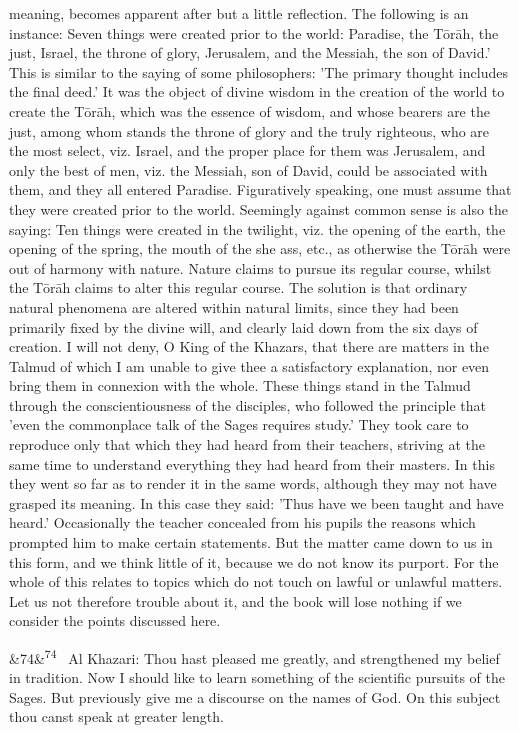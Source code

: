 \documentclass[12pt]{article}
\newcommand{\para}[1][]{\par\noindent\ifx&#1&\else\textsuperscript{\footnotesize #1}~\fi}
\begin{document}
meaning, becomes apparent after but a little reflection. The following is an instance: Seven things were created prior to the world: Paradise, the Tōrāh, the just, Israel, the throne of glory, Jerusalem, and the Messiah, the son of David.' This is similar to the saying of some philosophers: 'The primary thought includes the final deed.' It was the object of divine wisdom in the creation of the world to create the Tōrāh, which was the essence of wisdom, and whose bearers are the just, among whom stands the throne of glory and the truly righteous, who are the most select, viz. Israel, and the proper place for them was Jerusalem, and only the best of men, viz. the Messiah, son of David, could be associated with them, and they all entered Paradise. Figuratively speaking, one must assume that they were created prior to the world. Seemingly against common sense is also the saying: Ten things were created in the twilight, viz. the opening of the earth, the opening of the spring, the mouth of the she ass, etc., as otherwise the Tōrāh were out of harmony with nature. Nature claims to pursue its regular course, whilst the Tōrāh claims to alter this regular course. The solution is that ordinary natural phenomena are altered within natural limits, since they had been primarily fixed by the divine will, and clearly laid down from the six days of creation. I will not deny, O King of the Khazars, that there are matters in the Talmud of which I am unable to give thee a satisfactory explanation, nor even bring them in connexion with the whole. These things stand in the Talmud through the conscientiousness of the disciples, who followed the principle that 'even the commonplace talk of the Sages requires study.' They took care to reproduce only that which they had heard from their teachers, striving at the same time to understand everything they had heard from their masters. In this they went so far as to render it in the same words, although they may not have grasped its meaning. In this case they said: 'Thus have we been taught and have heard.' Occasionally the teacher concealed from his pupils the reasons which prompted him to make certain statements. But the matter came down to us in this form, and we think little of it, because we do not know its purport. For the whole of this relates to topics which do not touch on lawful or unlawful matters. Let us not therefore trouble about it, and the book will lose nothing if we consider the points discussed here.

\para[74] Al Khazari: Thou hast pleased me greatly, and strengthened my belief in tradition. Now I should like to learn something of the scientific pursuits of the Sages. But previously give me a discourse on the names of God. On this subject thou canst speak at greater length.
\end{document}

